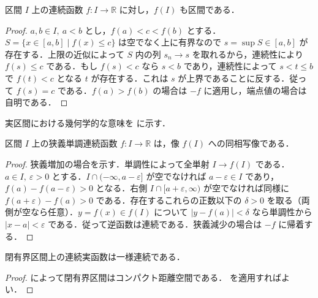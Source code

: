 \begin{prop}[中間値の定理]
区間 $I$ 上の連続函数 $f:I\to\mathbb R$ に対し，$f(I)$ も区間である．
\end{prop}
\begin{proof}
$a,b\in I,\ a<b$ とし，$f(a)<c<f(b)$ とする．$S=\{x\in[a,b]\mid f(x)\leq c\}$ は空でなく上に有界なので $s=\sup S\in[a,b]$ が存在する．上限の近似によって $S$ 内の列 $s_n\to s$ を取れるから，連続性により $f(s)\leq c$ である．もし $f(s)<c$ なら $s<b$ であり，連続性によって $s<t\leq b$ で $f(t)<c$ となる $t$ が存在する．これは $s$ が上界であることに反する．従って $f(s)=c$ である．$f(a)>f(b)$ の場合は $-f$ に適用し，端点値の場合は自明である．
\end{proof}
実区間における幾何学的な意味を  に示す．
\begin{prop}[狭義単調連続函数の逆函数]
区間 $I$ 上の狭義単調連続函数 $f:I\to\mathbb R$ は，像 $f(I)$ への同相写像である．
\end{prop}
\begin{proof}
狭義増加の場合を示す．単調性によって全単射 $I\to f(I)$ である．$a\in I,\ \varepsilon>0$ とする．$I\cap(-\infty,a-\varepsilon]$ が空でなければ $a-\varepsilon\in I$ であり，$f(a)-f(a-\varepsilon)>0$ となる．右側 $I\cap[a+\varepsilon,\infty)$ が空でなければ同様に $f(a+\varepsilon)-f(a)>0$ である．存在するこれらの正数以下の $\delta>0$ を取る（両側が空なら任意）．$y=f(x)\in f(I)$ について $|y-f(a)|<\delta$ なら単調性から $|x-a|<\varepsilon$ である．従って逆函数は連続である．狭義減少の場合は $-f$ に帰着する．
\end{proof}
\begin{prop}[閉区間上の一様連続性]
閉有界区間上の連続実函数は一様連続である．
\end{prop}
\begin{proof}
 によって閉有界区間はコンパクト距離空間である． を適用すればよい．
\end{proof}
